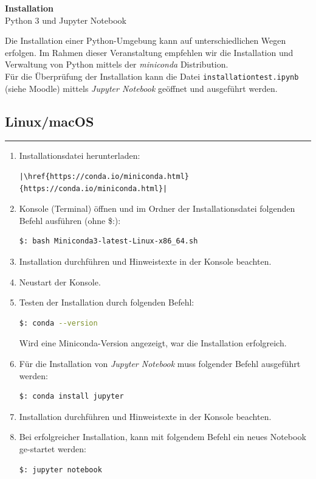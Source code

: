 \documentclass[11pt, a4paper, headheight=70pt]{scrartcl}
\newcommand{\subsecline}[1]{\subsection*{#1}
\vspace{-0.5cm}
\noindent\rule{\textwidth}{0.5pt}
\vspace{0cm}}
\begin{document}
{\Large \textbf{Installation}}\\[0.2cm]
{\Large Python 3 und Jupyter Notebook}

\vspace{0.8cm}

Die Installation einer Python-Umgebung kann auf unterschiedlichen Wegen erfolgen. Im Rahmen dieser Veranstaltung empfehlen wir die Installation und Verwaltung von Python mittels der \textit{miniconda} Distribution. \\
Für die Überprüfung der Installation kann die Datei \texttt{installation\textunderscore test.ipynb} (siehe Moodle) mittels \textit{Jupyter Notebook} geöffnet und ausgeführt werden.


\subsecline{Linux/macOS}
\begin{enumerate}[itemsep=0.3cm]
\item Installationsdatei herunterladen:
\begin{lstlisting}[escapechar=|, basicstyle=\footnotesize]
|\href{https://conda.io/miniconda.html}{https://conda.io/miniconda.html}|
\end{lstlisting}

\item Konsole (Terminal) öffnen und im Ordner der Installationsdatei folgenden Befehl ausführen (ohne \$:):
\begin{lstlisting}[backgroundcolor = \color{lightgray}, language = Bash, framerule=0pt, basicstyle=\small]
$: bash Miniconda3-latest-Linux-x86_64.sh
\end{lstlisting}

\item Installation durchführen und Hinweistexte in der Konsole beachten.
\item Neustart der Konsole.

\item Testen der Installation durch folgenden Befehl:
\begin{lstlisting}[backgroundcolor = \color{lightgray}, language = Bash, framerule=0pt, basicstyle=\small]
$: conda --version 
\end{lstlisting}
Wird eine Miniconda-Version angezeigt, war die Installation erfolgreich.

\item Für die Installation von \textit{Jupyter Notebook} muss folgender Befehl ausgeführt \linebreak werden:
\begin{lstlisting}[backgroundcolor = \color{lightgray}, language = Bash, framerule=0pt, basicstyle=\small]
$: conda install jupyter
\end{lstlisting}

\item Installation durchführen und Hinweistexte in der Konsole beachten.
%
\item Bei erfolgreicher Installation, kann mit folgendem Befehl ein neues Notebook ge-startet werden:
\begin{lstlisting}[backgroundcolor = \color{lightgray}, language = Bash, framerule=0pt, basicstyle=\small]
$: jupyter notebook
\end{lstlisting}
\end{enumerate}
\end{document}
